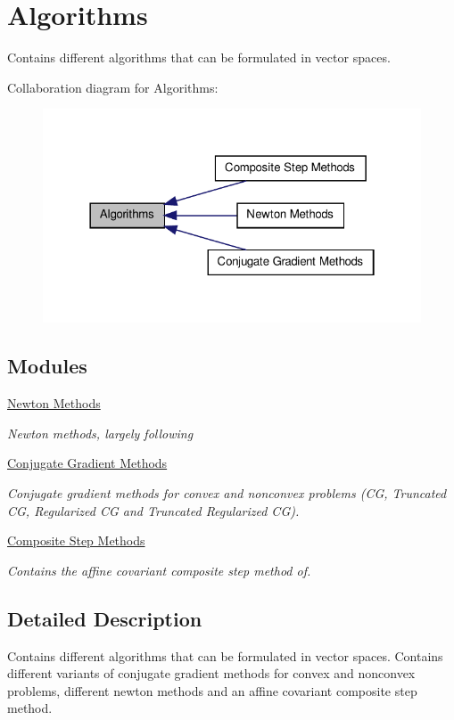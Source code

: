 \hypertarget{group__AlgorithmGroup}{\section{\-Algorithms}
\label{group__AlgorithmGroup}
}


\-Contains different algorithms that can be formulated in vector spaces.  


\-Collaboration diagram for \-Algorithms\-:
\nopagebreak
\begin{figure}[H]
\begin{center}
\leavevmode
\includegraphics[width=322pt]{group__AlgorithmGroup}
\end{center}
\end{figure}
\subsection*{\-Modules}
\begin{DoxyCompactItemize}
\item 
\hyperlink{group__NewtonGroup}{\-Newton Methods}
\begin{DoxyCompactList}\small\item\em \-Newton methods, largely following \end{DoxyCompactList}\item 
\hyperlink{group__CGGroup}{\-Conjugate Gradient Methods}
\begin{DoxyCompactList}\small\item\em \-Conjugate gradient methods for convex and nonconvex problems (\-C\-G, \-Truncated \-C\-G, \-Regularized \-C\-G and \-Truncated \-Regularized \-C\-G). \end{DoxyCompactList}\item 
\hyperlink{group__CSGroup}{\-Composite Step Methods}
\begin{DoxyCompactList}\small\item\em \-Contains the affine covariant composite step method of. \end{DoxyCompactList}\end{DoxyCompactItemize}


\subsection{\-Detailed \-Description}
\-Contains different algorithms that can be formulated in vector spaces. \-Contains different variants of conjugate gradient methods for convex and nonconvex problems, different newton methods and an affine covariant composite step method. 